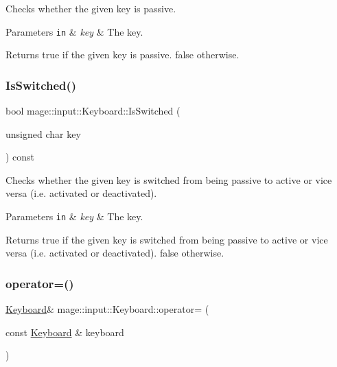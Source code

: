 Checks whether the given key is passive.


\begin{DoxyParams}[1]{Parameters}
\mbox{\tt in}  & {\em key} & The key. \\
\hline
\end{DoxyParams}
\begin{DoxyReturn}{Returns}
{\ttfamily true} if the given key is passive. {\ttfamily false} otherwise. 
\end{DoxyReturn}
\mbox{\label{classmage_1_1input_1_1_keyboard_a722ae998e69214f9126a4ee60397c208}} 
\subsubsection{\texorpdfstring{Is\+Switched()}{IsSwitched()}}
{\footnotesize\ttfamily bool mage\+::input\+::\+Keyboard\+::\+Is\+Switched (\begin{DoxyParamCaption}\item[{unsigned char}]{key }\end{DoxyParamCaption}) const\hspace{0.3cm}{\ttfamily [noexcept]}}

Checks whether the given key is switched from being passive to active or vice versa (i.\+e. activated or deactivated).


\begin{DoxyParams}[1]{Parameters}
\mbox{\tt in}  & {\em key} & The key. \\
\hline
\end{DoxyParams}
\begin{DoxyReturn}{Returns}
{\ttfamily true} if the given key is switched from being passive to active or vice versa (i.\+e. activated or deactivated). {\ttfamily false} otherwise. 
\end{DoxyReturn}
\mbox{\label{classmage_1_1input_1_1_keyboard_a8a06eeb906625f100928f3fe2d17cf9d}} 
\subsubsection{\texorpdfstring{operator=()}{operator=()}\hspace{0.1cm}{\footnotesize\ttfamily [1/2]}}
{\footnotesize\ttfamily \mbox{\hyperlink{classmage_1_1input_1_1_keyboard}{Keyboard}}\& mage\+::input\+::\+Keyboard\+::operator= (\begin{DoxyParamCaption}\item[{const \mbox{\hyperlink{classmage_1_1input_1_1_keyboard}{Keyboard}} \&}]{keyboard }\end{DoxyParamCaption})\hspace{0.3cm}{\ttfamily [delete]}}


